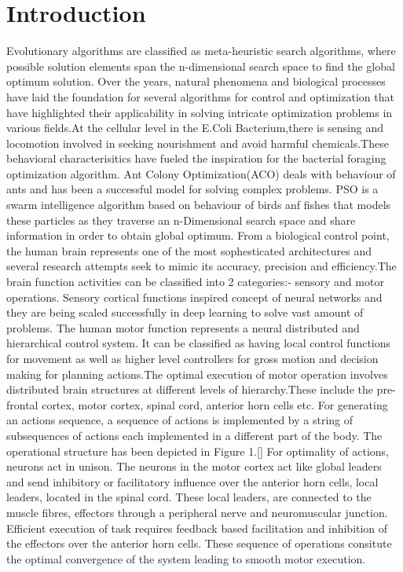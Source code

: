 \section{Introduction}

Evolutionary algorithms are classified as meta-heuristic search algorithms, where possible solution elements span the n-dimensional search space to find the global optimum solution. Over the years, natural phenomena and biological processes have laid the foundation for several algorithms for control and optimization that have highlighted their applicability in solving intricate optimization problems in various fields.At the cellular level in the E.Coli Bacterium,there is sensing and locomotion involved in seeking nourishment and avoid harmful chemicals.These behavioral characterisitics have fueled the inspiration for the bacterial foraging optimization algorithm. Ant Colony Optimization(ACO) deals with behaviour of ants and has been a successful model for solving complex problems. PSO is a swarm intelligence algorithm based on behaviour of birds anf fishes that models these particles as they traverse an n-Dimensional search space and share information in order to obtain global optimum.
From a biological control point, the human brain represents one of the most sophesticated architectures and several research attempts seek to mimic its accuracy, precision and efficiency.The brain function activities can be classified into 2 categories:- sensory and motor operations. Sensory cortical functions inspired concept of neural networks and they are being scaled successfully in deep learning to solve vast amount of problems. 
The human motor function represents a neural distributed and hierarchical control system. It can be classified as having local control functions for movement as well as higher level controllers for gross motion and decision making for planning actions.The optimal execution of motor operation involves distributed brain structures at different levels of hierarchy.These include the pre-frontal cortex, motor cortex, spinal cord, anterior horn cells etc. For generating an actions sequence, a sequence of actions is implemented by a string of subsequences of actions each implemented in a different part of the body. The operational structure has been depicted in Figure 1.[]
For optimality of actions, neurons act in unison. The neurons in the motor cortex act like global leaders and send inhibitory or facilitatory influence over the anterior horn cells, local leaders, located in the spinal cord. These local leaders, are connected to the muscle fibres, effectors through a peripheral nerve and neuromuscular junction.
Efficient execution of task requires feedback based facilitation and inhibition of the effectors over the anterior horn cells. These sequence of operations consitute the optimal convergence of the system leading to smooth motor execution.

